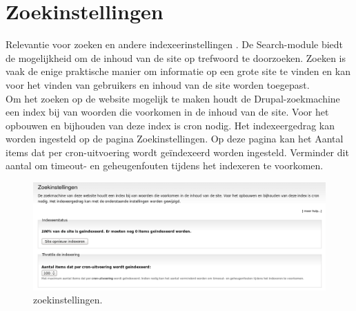 \section{Zoekinstellingen} 
    Relevantie voor zoeken en andere indexeerinstellingen
    . De Search-module  biedt
    de mogelijkheid om de inhoud van de site op trefwoord te doorzoeken. Zoeken is vaak de enige praktische manier om informatie op een grote site te vinden en kan voor het vinden van gebruikers en inhoud van de site worden toegepast.
\\
Om het zoeken op de website mogelijk te maken houdt de Drupal-zoekmachine een index bij 
van woorden die voorkomen in de inhoud van de site. Voor het opbouwen en bijhouden 
van deze index is cron nodig. Het indexeergedrag kan worden ingesteld op de pagina 
Zoekinstellingen. Op deze pagina kan het Aantal items dat per cron-uitvoering
wordt ge\"indexeerd worden ingesteld. Verminder dit aantal om timeout- en
geheugenfouten tijdens het indexeren te voorkomen.
  \begin{figure}[!h]
    \centering
   \includegraphics[scale=0.3,angle=0]{zoekinstellingen}
   \caption{zoekinstellingen.\label{white}}
 \end{figure}